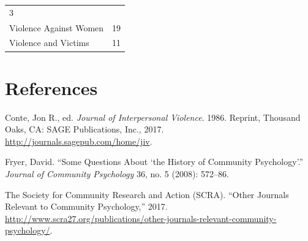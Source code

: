\documentclass[]{tufte-handout}
\begin{document}
\begin{longtable}[]{@{}ll@{}}
\begin{minipage}[t]{0.21\columnwidth}
3\strut
\end{minipage}\tabularnewline
\begin{minipage}[t]{0.56\columnwidth}\raggedright\strut
Violence Against Women\strut
\end{minipage} & \begin{minipage}[t]{0.21\columnwidth}\raggedright\strut
19\strut
\end{minipage}\tabularnewline
\begin{minipage}[t]{0.56\columnwidth}\raggedright\strut
Violence and Victims\strut
\end{minipage} & \begin{minipage}[t]{0.21\columnwidth}\raggedright\strut
11\strut
\end{minipage}\tabularnewline
\bottomrule
\end{longtable}

\newpage

\section*{References}\label{references}

\hypertarget{refs}{}
\hypertarget{ref-jiv}{}
Conte, Jon R., ed. \emph{Journal of Interpersonal Violence}. 1986.
Reprint, Thousand Oaks, CA: SAGE Publications, Inc., 2017.
\url{http://journals.sagepub.com/home/jiv}.

\hypertarget{ref-fryer2008some}{}
Fryer, David. ``Some Questions About `the History of Community
Psychology'.'' \emph{Journal of Community Psychology} 36, no. 5 (2008):
572--86.

\hypertarget{ref-scra2017other}{}
The Society for Community Research and Action (SCRA). ``Other Journals
Relevant to Community Psychology,'' 2017.
\url{http://www.scra27.org/publications/other-journals-relevant-community-psychology/}.
\end{document}
